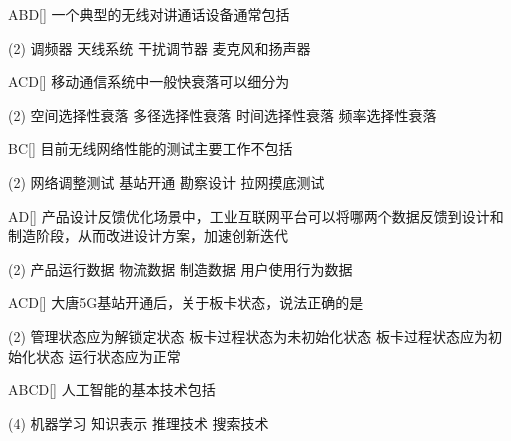 \begin{choice}{\;ABD\;}[]
    一个典型的无线对讲通话设备通常包括

    \begin{tasks}(2)
        \task 调频器
        \task 天线系统
        \task 干扰调节器
        \task 麦克风和扬声器
    \end{tasks}
\end{choice}

\begin{choice}{\;ACD\;}[]
    移动通信系统中一般快衰落可以细分为
    \begin{tasks}(2)
        \task 空间选择性衰落
        \task 多径选择性衰落
        \task 时间选择性衰落
        \task 频率选择性衰落
    \end{tasks}
\end{choice}


\begin{choice}{\;BC\;}[]
    目前无线网络性能的测试主要工作不包括

    \begin{tasks}(2)
        \task 网络调整测试
        \task 基站开通
        \task 勘察设计
        \task 拉网摸底测试
    \end{tasks}
\end{choice}


\begin{choice}{\;AD\;}[]
    产品设计反馈优化场景中，工业互联网平台可以将哪两个数据反馈到设计和制造阶段，从而改进设计方案，加速创新迭代
    \begin{tasks}(2)
        \task 产品运行数据
        \task 物流数据
        \task 制造数据
        \task 用户使用行为数据
    \end{tasks}
\end{choice}


\begin{choice}{\;ACD\;}[]
    大唐5G基站开通后，关于板卡状态，说法正确的是
    \begin{tasks}(2)
        \task 管理状态应为解锁定状态
        \task 板卡过程状态为未初始化状态
        \task 板卡过程状态应为初始化状态
        \task 运行状态应为正常
    \end{tasks}
\end{choice}


\begin{choice}{\;ABCD\;}[]
    人工智能的基本技术包括
    \begin{tasks}(4)
        \task 机器学习
        \task 知识表示
        \task 推理技术
        \task 搜索技术
    \end{tasks}
\end{choice}


